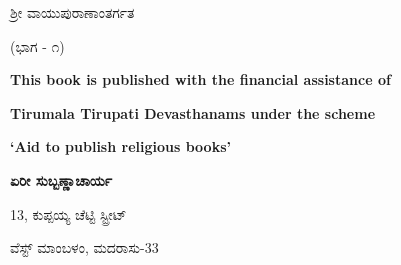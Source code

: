 \thispagestyle{empty}
{
\begin{center}
\end{center}

\bigskip

\centerline{\large ಶ್ರೀ ವಾಯುಪುರಾಣಾಂತರ್ಗತ}

\medskip
 

\medskip

\centerline{\large (ಭಾಗ - ೧)}


\vfill

\begin{center}
{\bf This book is published with the financial assistance of}

{\bf Tirumala Tirupati Devasthanams under the scheme}

{\bf `Aid to publish religious books'}
\end{center}

\vfill


\smallskip

{\bf\LARGE ಏರೀ ಸುಬ್ಬಣ್ಣಾಚಾರ್ಯ}

\medskip


\vfill


\medskip


\smallskip

\centerline{13, ಕುಪ್ಪಯ್ಯ ಚೆಟ್ಟಿ  ಸ್ಟ್ರೀಟ್}

\centerline{ವೆಸ್ಟ್ ಮಾಂಬಳಂ, ಮದರಾಸು-33}
}
